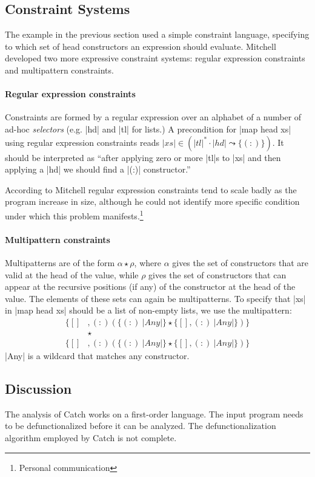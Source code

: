 \subsection{Constraint Systems}
The example in the previous section used a simple constraint language, specifying to which set of head constructors an expression should evaluate. Mitchell developed two more expressive constraint systems: regular expression constraints and multipattern constraints.

\paragraph{Regular expression constraints} Constraints are formed by a regular expression over an alphabet of a number of ad-hoc \emph{selectors} (e.g. |hd| and |tl| for lists.) A precondition for |map head xs| using regular expression constraints reads $|xs| \in (|tl|^{*} \cdot |hd| \leadsto \{(:)\})$. It should be interpreted as ``after applying zero or more |tl|s to |xs| and then applying a |hd| we should find a |(:)| constructor.''

According to Mitchell regular expression constraints tend to scale badly as the program increase in size, although he could not identify more specific condition under which this problem manifests.\footnote{Personal communication}

\paragraph{Multipattern constraints} Multipatterns are of the form $\alpha \star \rho$, where $\alpha$ gives the set of constructors that are valid at the head of the value, while $\rho$ gives the set of constructors that can appear at the recursive positions (if any) of the constructor at the head of the value. The elements of these sets can again be multipatterns. To specify that |xs| in |map head xs| should be a list of non-empty lists, we use the multipattern:
\begin{align*}
\{[]&, (:) (\{(:)\ |Any| \} \star \{ [], (:)\ |Any|\})\} \\
&\star \\
\{[]&, (:) (\{(:)\ |Any| \} \star \{ [], (:)\ |Any|\})\}
\end{align*}
|Any| is a wildcard that matches any constructor.

\subsection{Discussion}
The analysis of Catch works on a first-order language. The input program needs to be defunctionalized before it can be analyzed. The defunctionalization algorithm employed by Catch is not complete.

